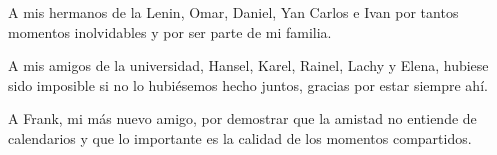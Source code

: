 \begin{acknowledgements}
    A mis hermanos de la Lenin, Omar, Daniel, Yan Carlos e Ivan por tantos momentos inolvidables y por ser parte de mi familia.

    A mis amigos de la universidad, Hansel, Karel, Rainel, Lachy y Elena, hubiese sido imposible si no lo hubi\'esemos hecho juntos, gracias por estar
    siempre ah\'i.

    A Frank, mi m\'as nuevo amigo, por demostrar que la amistad no entiende de calendarios y que lo importante es la calidad de los momentos compartidos.
    


    








\end{acknowledgements}